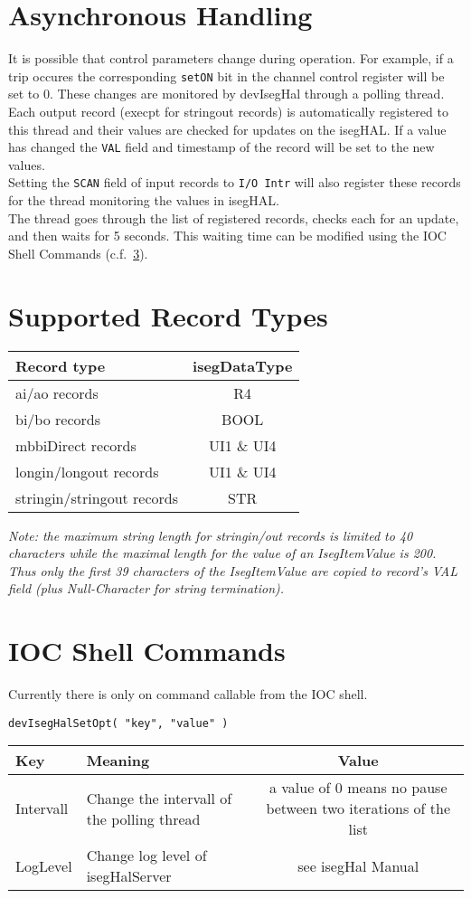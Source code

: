 \documentclass[a4paper,10pt]{scrartcl}
\begin{document}
\section{Asynchronous Handling}
It is possible that control parameters change during operation. For example, if a trip occures
the corresponding \lstinline|setON| bit in the channel control register will be set to 0.
These changes are monitored by devIsegHal through a polling thread.
Each output record (execpt for stringout records) is automatically registered to this thread
and their values are checked for updates on the isegHAL. If a value has changed
the \lstinline|VAL| field and timestamp of the record will be set to the new values.\\
Setting the \lstinline|SCAN| field of input records to \lstinline|I/O Intr| will also
register these records for the thread monitoring the values in isegHAL.\\
The thread goes through the list of registered records, checks each for an update, and
then waits for 5 seconds. This waiting time can be modified using the IOC Shell Commands (c.f.~\ref{iocCmd}).

\section{Supported Record Types}
\begin{tabular}{|l|c|}
\hline
Record type & isegDataType \\ \hline
ai/ao records & R4 \\
bi/bo records & BOOL \\
mbbiDirect records & UI1 \& UI4\\
longin/longout records & UI1 \& UI4\\
stringin/stringout records & STR\\
\hline
\end{tabular}

{\em Note: the maximum string length for stringin/out records is limited to 40 characters while the maximal length for the value of an IsegItemValue is 200.
Thus only the first 39 characters of the IsegItemValue are copied to record's VAL field (plus Null-Character for string termination).}

\section{IOC Shell Commands}\label{iocCmd}
Currently there is only on command callable from the IOC shell.
\begin{lstlisting}
devIsegHalSetOpt( "key", "value" )
\end{lstlisting}
\begin{tabular}{|l|l|c|}
\hline
Key & Meaning & Value \\ \hline
Intervall & Change the intervall of the polling thread & a value of 0 means no pause between two iterations of the list \\
LogLevel & Change log level of isegHalServer & see isegHal Manual \\
\hline
\end{tabular}
\end{document}

